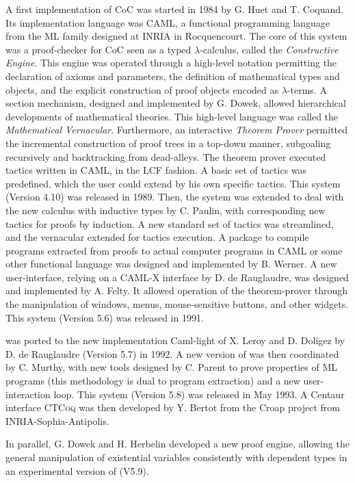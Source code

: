 A first implementation of CoC was started in 1984 by G. Huet and T.
Coquand.  Its implementation language was CAML, a functional
programming language from the ML family designed at INRIA in
Rocquencourt. The core of this system was a proof-checker for CoC seen
as a typed $\lambda$-calculus, called the \emph{Constructive Engine}.
This engine was operated through a high-level notation permitting the
declaration of axioms and parameters, the definition of mathematical
types and objects, and the explicit construction of proof objects
encoded as $\lambda$-terms. A section mechanism, designed and
implemented by G. Dowek, allowed hierarchical developments of
mathematical theories. This high-level language was called the
\emph{Mathematical Vernacular}.  Furthermore, an interactive
\emph{Theorem Prover} permitted the incremental construction of proof
trees in a top-down manner, subgoaling recursively and backtracking
from dead-alleys. The theorem prover executed tactics written in CAML,
in the LCF fashion.  A basic set of tactics was predefined, which the
user could extend by his own specific tactics. This system (Version
4.10) was released in 1989.  Then, the system was extended to deal
with the new calculus with inductive types by C. Paulin, with
corresponding new tactics for proofs by induction.  A new standard set
of tactics was streamlined, and the vernacular extended for tactics
execution. A package to compile programs extracted from proofs to
actual computer programs in CAML or some other functional language was
designed and implemented by B. Werner.  A new user-interface, relying
on a CAML-X interface by D. de Rauglaudre, was designed and
implemented by A. Felty. It allowed operation of the theorem-prover
through the manipulation of windows, menus, mouse-sensitive buttons,
and other widgets. This system (Version 5.6) was released in 1991.

\Coq{} was ported to the new implementation Caml-light of X. Leroy and
D.  Doligez by D. de Rauglaudre (Version 5.7) in 1992.  A new version
of \Coq{} was then coordinated by C. Murthy, with new tools designed
by C.  Parent to prove properties of ML programs (this methodology is
dual to program extraction) and a new user-interaction loop.  This
system (Version 5.8) was released in May 1993.  A Centaur interface
\textsc{CTCoq} was then developed by Y. Bertot from the Croap project
from INRIA-Sophia-Antipolis.

In parallel, G. Dowek and H. Herbelin developed a new proof engine,
allowing the general manipulation of existential variables
consistently with dependent types in an experimental version of \Coq{}
(V5.9).

